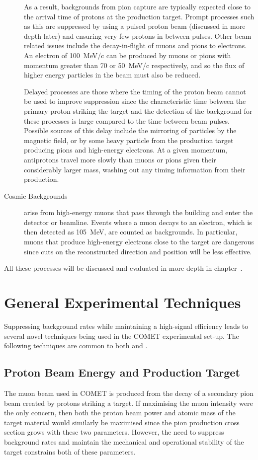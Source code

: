 \begin{description}
As a result, backgrounds from pion capture are typically expected close to the arrival time of protons at the production target.
Prompt processes such as this are suppressed by using a pulsed proton beam (discussed in more depth later) and ensuring very few protons in between pulses.
Other beam related issues include the decay-in-flight of muons and pions to electrons.
An electron of 100~MeV/c can be produced by muons or pions with momentum greater than 70 or 50~MeV/c respectively, and so the flux of higher energy particles in the beam must also be reduced.

Delayed processes are those where the timing of the proton beam cannot be used to improve suppression since the characteristic time between the primary proton striking the target and the detection of the background for these processes is large compared to the time between beam pulses.
Possible sources of this delay include the mirroring of particles by the magnetic field, or by some heavy particle from the production target producing pions and high-energy electrons.
At a given momentum, antiprotons travel more slowly than muons or pions given their considerably larger mass, washing out any timing information from their production.

\item [Cosmic Backgrounds]
 arise from high-energy muons that pass through the building and enter the detector or beamline.  
Events where a muon decays to an electron, which is then detected as 105~MeV, are counted as backgrounds.
In particular, muons that produce high-energy electrons close to the target are dangerous since cuts on the reconstructed direction and position will be less effective.
\end{description}

All these processes will be discussed and evaluated in more depth in chapter~.
\TabBackgroundSummary%

\section{General Experimental Techniques}
Suppressing background rates while maintaining a high-signal efficiency leads to several novel techniques being used in the COMET experimental set-up.
The following techniques are common to both \phaseI and \phaseII.

\subsection{Proton Beam Energy and Production Target}
The muon beam used in COMET is produced from the decay of a secondary pion beam created by protons striking a target.
If maximising the muon intensity were the only concern, then both the proton beam power and atomic mass of the target material would similarly be maximised since the pion production cross section
grows with these two parameters.
However, the need to suppress background rates and maintain the mechanical and operational stability of the target constrains both of these parameters.

